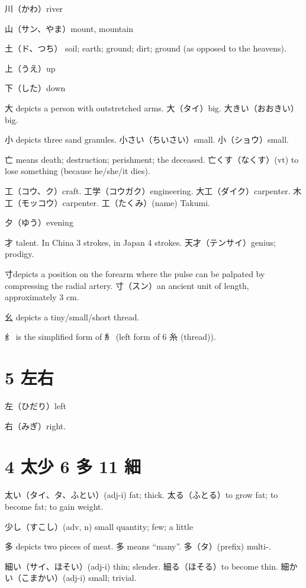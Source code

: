 川（かわ）river

山（サン、やま）mount, mountain

土（ド、つち）
soil; earth; ground; dirt; ground (as opposed to the heavens).

上（うえ）up

下（した）down

大 depicts a person with outstretched arms.
大（タイ）big.
大きい（おおきい）big.

小 depicts three sand granules.
小さい（ちいさい）small.
小（ショウ）small.

亡 means death; destruction; perishment; the deceased.
亡くす（なくす）(vt) to lose something (because he/she/it dies).

工（コウ、ク）craft.
工学（コウガク）engineering.
大工（ダイク）carpenter.
木工（モッコウ）carpenter.
工（たくみ）(name) Takumi.

夕（ゆう）evening

才 talent.
In China 3 strokes, in Japan 4 strokes.
天才（テンサイ）genius; prodigy.

寸depicts a position on the forearm
where the pulse can be palpated by compressing the radial artery.
寸（スン）an ancient unit of length, approximately 3 cm.

幺 depicts a tiny/small/short thread.

纟 is the simplified form of 糹
(left form of 6 糸 (thread)).

\section{5 左右}

左（ひだり）left

右（みぎ）right.

\section{4 太少 6 多 11 細}

太い（タイ、タ、ふとい）(adj-i) fat; thick.
太る（ふとる）to grow fat; to become fat; to gain weight.

少し（すこし）(adv, n) small quantity; few; a little

多 depicts two pieces of meat.
多 means ``many''.
多（タ）(prefix) multi-.

細い（サイ、ほそい）(adj-i) thin; slender.
細る（ほそる）to become thin.
細かい（こまかい）(adj-i) small; trivial.

